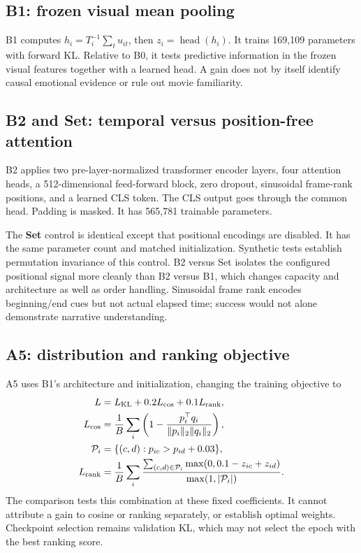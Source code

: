 \documentclass[11pt,a4paper]{article}
\newcommand{\KL}{\operatorname{KL}}
\begin{document}
\subsection{B1: frozen visual mean pooling}
B1 computes $h_i=T_i^{-1}\sum_t u_{it}$, then $z_i=\operatorname{head}(h_i)$. It trains 169,109 parameters with forward KL. Relative to B0, it tests predictive information in the frozen visual features together with a learned head. A gain does not by itself identify causal emotional evidence or rule out movie familiarity.

\subsection{B2 and Set: temporal versus position-free attention}
B2 applies two pre-layer-normalized transformer encoder layers, four attention heads, a 512-dimensional feed-forward block, zero dropout, sinusoidal frame-rank positions, and a learned CLS token. The CLS output goes through the common head. Padding is masked. It has 565,781 trainable parameters.

The \textbf{Set} control is identical except that positional encodings are disabled. It has the same parameter count and matched initialization. Synthetic tests establish permutation invariance of this control. B2 versus Set isolates the configured positional signal more cleanly than B2 versus B1, which changes capacity and architecture as well as order handling. Sinusoidal frame rank encodes beginning/end cues but not actual elapsed time; success would not alone demonstrate narrative understanding.

\subsection{A5: distribution and ranking objective}
A5 uses B1's architecture and initialization, changing the training objective to
\begin{align}
L &= L_{\KL}+0.2L_{\cos}+0.1L_{\rm rank},\\
L_{\cos}&=\frac{1}{B}\sum_i\left(1-\frac{p_i^\top q_i}{\|p_i\|_2\|q_i\|_2}\right),\\
\mathcal P_i&=\{(c,d):p_{ic}>p_{id}+0.03\},\\
L_{\rm rank}&=\frac{1}{B}\sum_i\frac{\sum_{(c,d)\in\mathcal P_i}\max(0,0.1-z_{ic}+z_{id})}{\max(1,|\mathcal P_i|)}.
\end{align}
The comparison tests this combination at these fixed coefficients. It cannot attribute a gain to cosine or ranking separately, or establish optimal weights. Checkpoint selection remains validation KL, which may not select the epoch with the best ranking score.
\end{document}
